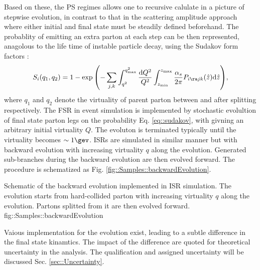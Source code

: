Based on these, the PS regimes allows one to recursive calulate in a picture of stepwise evolution, in contrast to that in the scattering amplitude approach where either initial and final state must be steadily defined beforehand. The probablity of emitting an extra parton at each step can be then represented, anagolous to the life time of instable particle decay, using the Sudakov form factors \cite{Sudakov}:
\begin{align}
S_{i}(q_1, q_2) = 1 - \exp{ \left( -\sum_{j,k} \int_{q^2}^{q_{\mathrm{max}}^2} \frac{\mathrm{d}Q^2}{Q^2} \int_{z_{\min}}^{z_{\max}} \frac{\alpha_s}{2\pi} P_{i \ra j k}(\hat{z}) \mathrm{d}\hat{z}  \right)},
\label{eq::sudakov}
\end{align}
where $q_1$ and $q_2$ denote the virtuality of parent parton between and after splitting respectively.
The FSR in event simulation is implemented by stochastic evolultion of final state parton legs on the probability Eq. \ref{eq::sudakov}, with givning an arbitrary initial virtuality $Q$. The evoluton is terminated typically until the virtuality becomes $\sim 1\gev$. ISRs are simulated in similar manner but with backward evolution with increasing virtuality $q$ along the evolution.
Generated sub-branches during the backward evolution are then evolved forward. The procedure is schematized as Fig. \ref{fig::Samples::backwardEvolution}.

{Schematic of the backward evolution implemented in ISR simulation. The evolution starts from hard-collided parton with increasing virtuality $q$ along the evolution. Partons splitted from it are then evolved forward.}
{fig::Samples::backwardEvolution}

Vaious implementation for the evolution exist, leading to a subtle difference in the final state kinamtics.
The impact of the difference are quoted for theoretical uncertainty in the analysis. The qualification and assigned uncertainty will be discussed Sec. \ref{sec::Uncertainty}. \\



